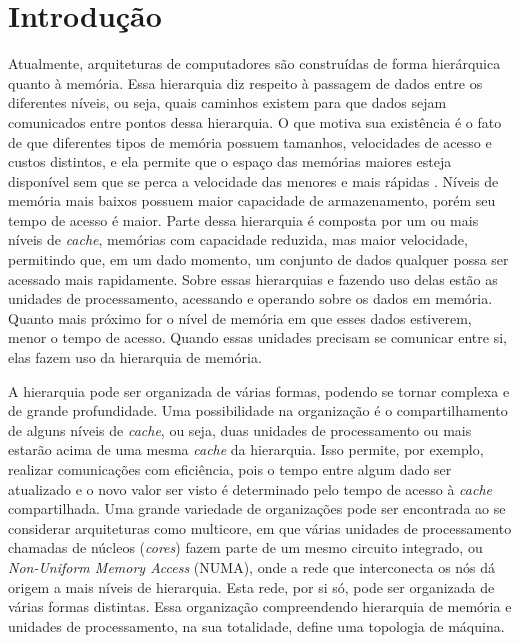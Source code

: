 \chapter{Introdução}
\label{cap:introducao}
\acresetall


Atualmente, arquiteturas de computadores são construídas de forma hierárquica quanto à memória.
Essa hierarquia diz respeito à passagem de dados entre os diferentes níveis, ou seja, quais caminhos existem para que dados sejam comunicados entre pontos dessa hierarquia.
O que motiva sua existência é o fato de que diferentes tipos de memória possuem tamanhos, velocidades de acesso e custos distintos, e ela permite que o espaço das memórias maiores esteja disponível sem que se perca a velocidade das menores e mais rápidas \cite{Patterson}.
Níveis de memória mais baixos possuem maior capacidade de armazenamento, porém seu tempo de acesso é maior.
Parte dessa hierarquia é composta por um ou mais níveis de \textit{cache}, memórias com capacidade reduzida, mas maior velocidade, permitindo que, em um dado momento, um conjunto de dados qualquer possa ser acessado mais rapidamente.
Sobre essas hierarquias e fazendo uso delas estão as unidades de processamento, acessando e operando sobre os dados em memória.
Quanto mais próximo for o nível de memória em que esses dados estiverem, menor o tempo de acesso.
Quando essas unidades precisam se comunicar entre si, elas fazem uso da hierarquia de memória.

A hierarquia pode ser organizada de várias formas, podendo se tornar complexa e de grande profundidade.
Uma possibilidade na organização é o compartilhamento de alguns níveis de \textit{cache}, ou seja, duas unidades de processamento ou mais estarão acima de uma mesma \textit{cache} da hierarquia.
Isso permite, por exemplo, realizar comunicações com eficiência, pois o tempo entre algum dado ser atualizado e o novo valor ser visto é determinado pelo tempo de acesso à \textit{cache} compartilhada.
Uma grande variedade de organizações pode ser encontrada ao se considerar arquiteturas como multicore, em que várias unidades de processamento chamadas de núcleos (\textit{cores}) fazem parte de um mesmo circuito integrado, ou \textit{Non-Uniform Memory Access} (NUMA), onde a rede que interconecta os nós dá origem a mais níveis de hierarquia. Esta rede, por si só, pode ser organizada de várias formas distintas.
Essa organização compreendendo hierarquia de memória e unidades de processamento, na sua totalidade, define uma topologia de máquina.

